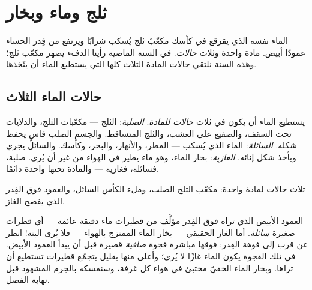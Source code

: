 \chapter{ثلج وماء وبخار}\label{ch:g2:ice-water-steam}

الماء نفسه الذي يقرقع في كأسك مكعّبَ ثلج يُسكب شرابًا ويرتفع من
قِدر الحساء عمودًا أبيض. مادة واحدة وثلاث \emph{حالات}. في السنة
الماضية رأينا الدفء يصهر مكعّب ثلج؛ وهذه السنة نلتقي حالات المادة
الثلاث كلها التي يستطيع الماء أن يتّخذها.

\section{حالات الماء الثلاث}

\begin{example}\label{ex:g2:ice-water-steam:where}
يستطيع الماء أن يكون في ثلاث \emph{حالات للمادة}. \emph{الصلبة}:
الثلج --- مكعّبات الثلج، والدلايات تحت السقف، والصقيع على العشب،
والثلج المتساقط. والجسم الصلب قاسٍ يحفظ شكله. \emph{السائلة}:
الماء الذي يُسكب --- المطر، والأنهار، والبحر، وكأسك. والسائل يجري
ويأخذ شكل إنائه. \emph{الغازية}: بخار الماء، وهو ماء يطير في
الهواء من غير أن يُرى. صلبة، فسائلة، فغازية --- والمادة تحتها
واحدة دائمًا.
\end{example}

\begin{omfigure}

{\small ثلاث حالات لمادة واحدة: مكعّب الثلج الصلب، وملء الكأس
السائل، والعمود فوق القِدر الذي يفضح الغاز.}
\end{omfigure}

\begin{remark}\label{rem:g2:ice-water-steam:invisible}
العمود الأبيض الذي تراه فوق القِدر مؤلَّف من قطيرات ماء دقيقة
عائمة --- أي قطرات صغيرة \emph{سائلة}. أما الغاز الحقيقي --- بخار
الماء الممتزج بالهواء --- فلا يُرى البتة! انظر عن قرب إلى فوهة
القِدر: فوقها مباشرة فجوة \emph{صافية} قصيرة قبل أن يبدأ العمود
الأبيض. في تلك الفجوة يكون الماء غازًا لا يُرى؛ وأعلى منها بقليل
يتجمّع قطيرات تستطيع أن تراها. وبخار الماء الخفيّ مختبئ في هواء
كل غرفة، وسنمسكه بالجرم المشهود قبل نهاية الفصل.
\end{remark}

